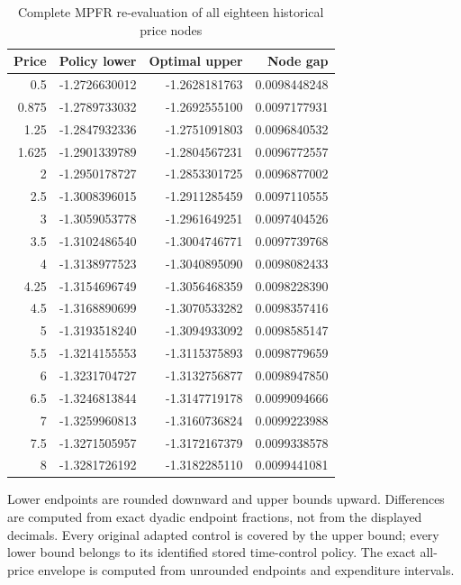 \begin{table}[htbp]\centering\small
\caption{Complete MPFR re-evaluation of all eighteen historical price nodes}\label{tab:suppmpfrnodes}
\begin{tabular}{rrrr}
\toprule
Price & Policy lower & Optimal upper & Node gap\\\midrule
0.5 & -1.2726630012 & -1.2628181763 & 0.0098448248\\
0.875 & -1.2789733032 & -1.2692555100 & 0.0097177931\\
1.25 & -1.2847932336 & -1.2751091803 & 0.0096840532\\
1.625 & -1.2901339789 & -1.2804567231 & 0.0096772557\\
2 & -1.2950178727 & -1.2853301725 & 0.0096877002\\
2.5 & -1.3008396015 & -1.2911285459 & 0.0097110555\\
3 & -1.3059053778 & -1.2961649251 & 0.0097404526\\
3.5 & -1.3102486540 & -1.3004746771 & 0.0097739768\\
4 & -1.3138977523 & -1.3040895090 & 0.0098082433\\
4.25 & -1.3154696749 & -1.3056468359 & 0.0098228390\\
4.5 & -1.3168890699 & -1.3070533282 & 0.0098357416\\
5 & -1.3193518240 & -1.3094933092 & 0.0098585147\\
5.5 & -1.3214155553 & -1.3115375893 & 0.0098779659\\
6 & -1.3231704727 & -1.3132756877 & 0.0098947850\\
6.5 & -1.3246813844 & -1.3147719178 & 0.0099094666\\
7 & -1.3259960813 & -1.3160736824 & 0.0099223988\\
7.5 & -1.3271505957 & -1.3172167379 & 0.0099338578\\
8 & -1.3281726192 & -1.3182285110 & 0.0099441081\\
\bottomrule\end{tabular}
\par\smallskip\footnotesize Lower endpoints are rounded downward and upper bounds upward. Differences are computed from exact dyadic endpoint fractions, not from the displayed decimals. Every original adapted control is covered by the upper bound; every lower bound belongs to its identified stored time-control policy. The exact all-price envelope is computed from unrounded endpoints and expenditure intervals.
\end{table}

